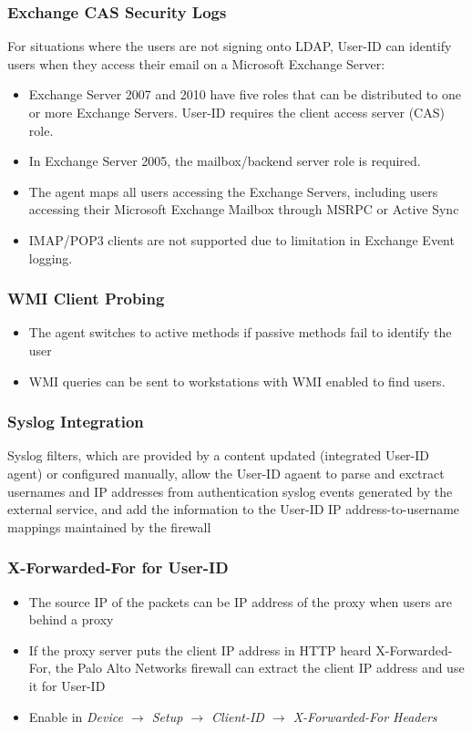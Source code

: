 \subsubsection{Exchange CAS Security Logs}
For situations where the users are not signing onto LDAP, User-ID can identify users when they access their email on a Microsoft Exchange Server:
\begin{itemize}
    \item Exchange Server 2007 and 2010 have five roles that can be distributed to one or more Exchange Servers. User-ID requires the client access server (CAS) role.
    \item In Exchange Server 2005, the mailbox/backend server role is required.
    \item The agent maps all users accessing the Exchange Servers, including users accessing their Microsoft Exchange Mailbox through MSRPC or Active Sync
    \item IMAP/POP3 clients are not supported due to limitation in Exchange Event logging.
\end{itemize}

\subsubsection{WMI Client Probing}
\begin{itemize}
    \item The agent switches to active methods if passive methods fail to identify the user
    \item WMI queries can be sent to workstations with WMI enabled to find users.
\end{itemize}

\subsubsection{Syslog Integration}
Syslog filters, which are provided by a content updated (integrated User-ID agent) or configured manually, allow the User-ID agaent to parse and exctract usernames and IP addresses from authentication syslog events generated by the external service, and add the information to the User-ID IP address-to-username mappings maintained by the firewall

\subsubsection{X-Forwarded-For for User-ID}
\begin{itemize}
    \item The source IP of the packets can be IP address of the proxy when users are behind a proxy
    \item If the proxy server puts the client IP address in HTTP heard X-Forwarded-For, the Palo Alto Networks firewall can extract the client IP address and use it for User-ID
    \item Enable in \textit{Device $\rightarrow$ Setup $\rightarrow$ Client-ID $\rightarrow$ X-Forwarded-For Headers}
\end{itemize}

